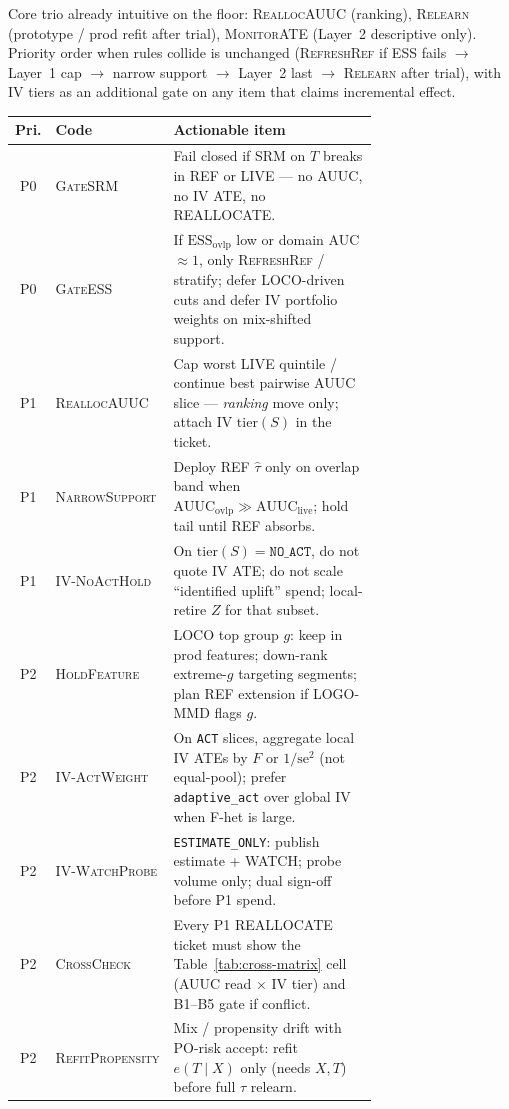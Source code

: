\documentclass{article}
\begin{document}
Core trio already intuitive on the floor: \textsc{ReallocAUUC} (ranking),
\textsc{Relearn} (prototype / prod refit after trial),
\textsc{MonitorATE} (Layer~2 descriptive only).
Priority order when rules collide is unchanged
(\textsc{RefreshRef} if ESS fails $\to$ Layer~1 cap $\to$ narrow support
$\to$ Layer~2 last $\to$ \textsc{Relearn} after trial), with IV tiers as an
additional gate on any item that claims incremental effect.

\begin{center}
\small
\begin{tabular}{@{}clp{0.72\linewidth}@{}}
\toprule
Pri. & Code & Actionable item \\
\midrule
P0 & \textsc{GateSRM} &
Fail closed if SRM on $T$ breaks in REF or LIVE --- no AUUC, no IV ATE, no REALLOCATE. \\
P0 & \textsc{GateESS} &
If $\mathrm{ESS}_{\mathrm{ovlp}}$ low or domain AUC$\approx 1$, only \textsc{RefreshRef} / stratify; defer LOCO-driven cuts and defer IV portfolio weights on mix-shifted support. \\
P1 & \textsc{ReallocAUUC} &
Cap worst LIVE quintile / continue best pairwise AUUC slice --- \emph{ranking} move only; attach IV $\mathrm{tier}(S)$ in the ticket. \\
P1 & \textsc{NarrowSupport} &
Deploy REF $\hat\tau$ only on overlap band when $\mathrm{AUUC}_{\mathrm{ovlp}}\gg\mathrm{AUUC}_{\mathrm{live}}$; hold tail until REF absorbs. \\
P1 & \textsc{IV-NoActHold} &
On $\mathrm{tier}(S)=\texttt{NO\_ACT}$, do not quote IV ATE; do not scale ``identified uplift'' spend; local-retire $Z$ for that subset. \\
P2 & \textsc{HoldFeature} &
LOCO top group $g$: keep in prod features; down-rank extreme-$g$ targeting segments; plan REF extension if LOGO-MMD flags $g$. \\
P2 & \textsc{IV-ActWeight} &
On \texttt{ACT} slices, aggregate local IV ATEs by $F$ or $1/\mathrm{se}^2$ (not equal-pool); prefer \texttt{adaptive\_act} over global IV when F-het is large. \\
P2 & \textsc{IV-WatchProbe} &
\texttt{ESTIMATE\_ONLY}: publish estimate + WATCH; probe volume only; dual sign-off before P1 spend. \\
P2 & \textsc{CrossCheck} &
Every P1 REALLOCATE ticket must show the Table~\ref{tab:cross-matrix} cell (AUUC read $\times$ IV tier) and B1--B5 gate if conflict. \\
P2 & \textsc{RefitPropensity} &
Mix / propensity drift with PO-risk accept: refit $e(T\mid X)$ only (needs $X,T$) before full $\tau$ relearn. \\

\end{tabular}
\end{center}
\end{document}

